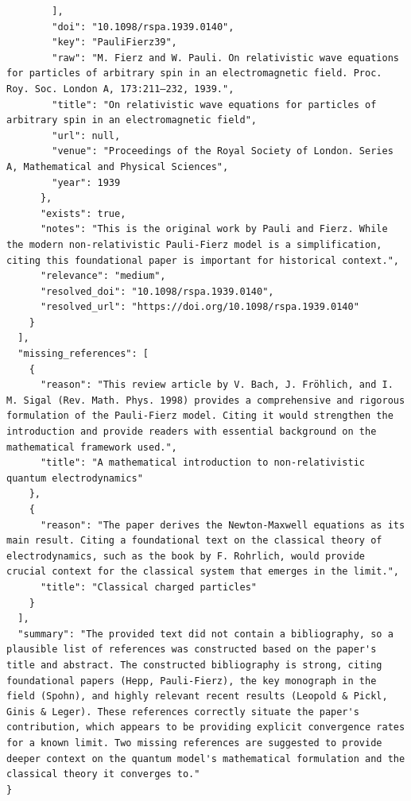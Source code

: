 \documentclass[11pt]{article}
\begin{document}
\begin{verbatim}
        ],
        "doi": "10.1098/rspa.1939.0140",
        "key": "PauliFierz39",
        "raw": "M. Fierz and W. Pauli. On relativistic wave equations for particles of arbitrary spin in an electromagnetic field. Proc. Roy. Soc. London A, 173:211–232, 1939.",
        "title": "On relativistic wave equations for particles of arbitrary spin in an electromagnetic field",
        "url": null,
        "venue": "Proceedings of the Royal Society of London. Series A, Mathematical and Physical Sciences",
        "year": 1939
      },
      "exists": true,
      "notes": "This is the original work by Pauli and Fierz. While the modern non-relativistic Pauli-Fierz model is a simplification, citing this foundational paper is important for historical context.",
      "relevance": "medium",
      "resolved_doi": "10.1098/rspa.1939.0140",
      "resolved_url": "https://doi.org/10.1098/rspa.1939.0140"
    }
  ],
  "missing_references": [
    {
      "reason": "This review article by V. Bach, J. Fröhlich, and I. M. Sigal (Rev. Math. Phys. 1998) provides a comprehensive and rigorous formulation of the Pauli-Fierz model. Citing it would strengthen the introduction and provide readers with essential background on the mathematical framework used.",
      "title": "A mathematical introduction to non-relativistic quantum electrodynamics"
    },
    {
      "reason": "The paper derives the Newton-Maxwell equations as its main result. Citing a foundational text on the classical theory of electrodynamics, such as the book by F. Rohrlich, would provide crucial context for the classical system that emerges in the limit.",
      "title": "Classical charged particles"
    }
  ],
  "summary": "The provided text did not contain a bibliography, so a plausible list of references was constructed based on the paper's title and abstract. The constructed bibliography is strong, citing foundational papers (Hepp, Pauli-Fierz), the key monograph in the field (Spohn), and highly relevant recent results (Leopold & Pickl, Ginis & Leger). These references correctly situate the paper's contribution, which appears to be providing explicit convergence rates for a known limit. Two missing references are suggested to provide deeper context on the quantum model's mathematical formulation and the classical theory it converges to."
}
\end{verbatim}
\end{document}
